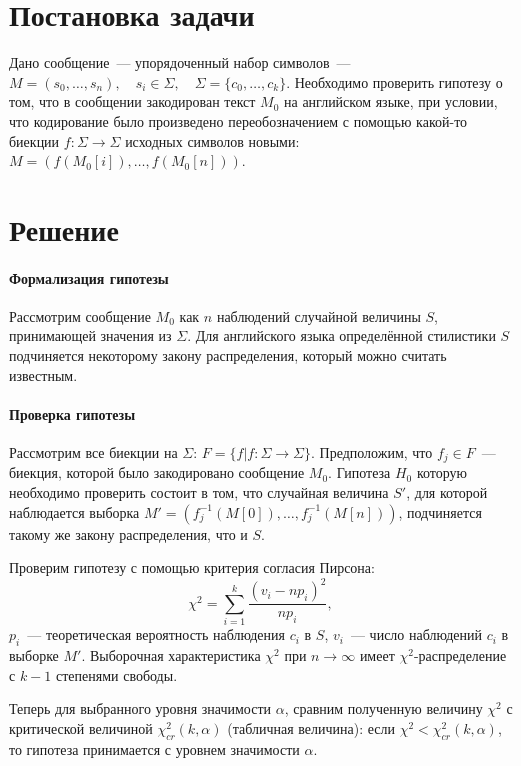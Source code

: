 \documentclass[a4paper,10pt]{article}
\begin{document}



\section{Постановка задачи}
Дано сообщение~--- упорядоченный набор символов~--- 
$M = (s_0, \ldots, s_n), \quad s_i \in \Sigma, \quad \Sigma = \{ c_0, \ldots, c_k \}$.
Необходимо проверить гипотезу о том, что в сообщении закодирован текст $M_0$
на английском языке, при условии, что кодирование было произведено 
переобозначением с помощью какой-то биекции 
$f \colon \Sigma \rightarrow \Sigma$ 
исходных символов новыми: 
$M = (f(M_0[i]), \ldots, f(M_0[n]))$.

\section{Решение}
\paragraph{Формализация гипотезы}
Рассмотрим сообщение $M_0$ как $n$ наблюдений случайной величины $S$, 
принимающей значения из $\Sigma$.
Для английского языка определённой стилистики $S$ подчиняется некоторому
закону распределения, который можно считать известным.

\paragraph{Проверка гипотезы}
Рассмотрим все биекции на $\Sigma$: 
$F = \{ f | f \colon \Sigma \rightarrow \Sigma \}$.
Предположим, что $f_j \in F$~--- биекция, которой было закодировано сообщение 
$M_0$.
Гипотеза $H_0$ которую необходимо проверить состоит в том, 
что случайная величина $S'$, для которой наблюдается выборка 
$M' = (f_j^{-1}(M[0]), \ldots, f_j^{-1}(M[n]))$,
подчиняется такому же закону распределения, что и $S$.

Проверим гипотезу с помощью критерия согласия Пирсона:
$$ \chi^2 = \sum_{i=1}^{k}\frac{(v_i - n p_i)^2}{n p_i}, $$
$p_i$~--- теоретическая вероятность наблюдения $c_i$ в $S$,
$v_i$~--- число наблюдений $c_i$ в выборке $M'$.
Выборочная характеристика $\chi^2$ при $n \rightarrow \infty$ имеет 
$\chi^2$-распределение с $k - 1$ степенями свободы.

Теперь для выбранного уровня значимости $\alpha$, сравним полученную величину
$\chi^2$ с критической величиной $\chi^2_{cr}(k, \alpha)$ (табличная величина): 
если $\chi^2 < \chi^2_{cr}(k, \alpha)$, то гипотеза принимается 
с уровнем значимости $\alpha$.
\end{document}
